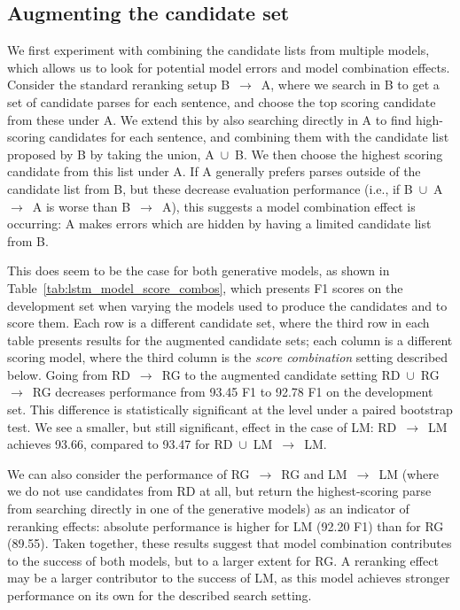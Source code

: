 \documentclass[11pt,a4paper]{article}
\newcommand{\p}{\ensuremath{\rightarrow}\xspace}
\newcommand{\un}{\ensuremath{\cup}\xspace}
\begin{document}
\subsection{Augmenting the candidate set}
\label{sec:augmenting}
We first experiment with combining the candidate lists from multiple models,  which allows us to look for potential model errors and model combination effects. Consider the standard reranking setup \mbox{B \p A}, where we search in B to get a set of candidate parses for each sentence, and choose the top scoring candidate from these under A. We extend this by also searching directly in A to find high-scoring candidates for each sentence, and combining them with the candidate list proposed by B by taking the union, \mbox{A \un B}. We then choose the highest scoring candidate from this list under A.
If A generally prefers parses outside of the candidate list from B, but these decrease evaluation performance (i.e., if \mbox{B \un A \p A} is worse than \mbox{B \p A}), this suggests a model combination effect is occurring: A makes errors which are hidden by having a limited candidate list from B.

This does seem to be the case for both generative models, as shown in Table~\ref{tab:lstm_model_score_combos}, which presents F1 scores on the development set when varying the models used to produce the candidates and to score them. Each row is a different candidate set, where the third row in each table presents results for the augmented candidate sets; each column is a different scoring model,  where the third column is the \emph{score combination} setting described below. Going from \mbox{RD \p RG} to the augmented candidate setting \mbox{RD \un RG \p RG} decreases performance from 93.45 F1 to 92.78 F1 on the development set. This difference is statistically significant at the  level under a paired bootstrap test. We see a smaller, but still significant, effect in the case of LM: \mbox{RD \p LM} achieves 93.66, compared to 93.47 for \mbox{RD \un LM \p LM}.

We can also consider the performance of \mbox{RG \p RG}  and \mbox{LM \p LM} (where we do not use candidates from RD at all, but return the highest-scoring parse from searching directly in one of the generative models) as an indicator of reranking effects: absolute performance is higher for LM (92.20 F1) than for RG (89.55).
Taken together, these results suggest that model combination contributes to the success of both models, but to a larger extent for RG. A reranking effect may be a larger contributor to the success of LM, as this model achieves stronger performance on its own for the described search setting.
\end{document}
